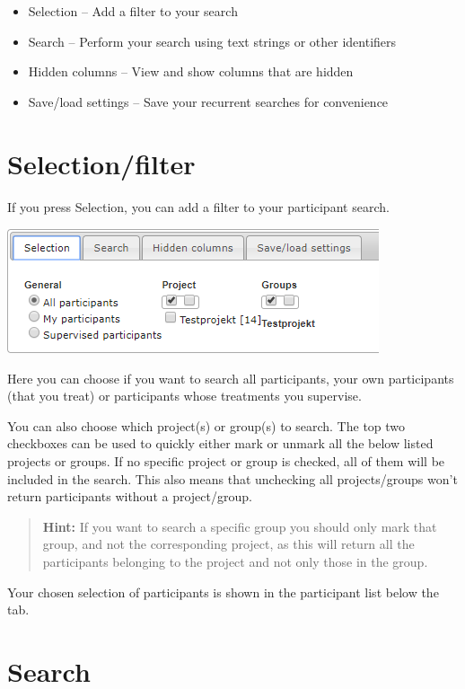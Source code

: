 \documentclass[]{book}
\providecommand{\tightlist}{%
  \setlength{\itemsep}{0pt}\setlength{\parskip}{0pt}}
\begin{document}
\begin{itemize}
\tightlist
\item
  Selection -- Add a filter to your search
\item
  Search -- Perform your search using text strings or other identifiers
\item
  Hidden columns -- View and show columns that are hidden
\item
  Save/load settings -- Save your recurrent searches for convenience
\end{itemize}

\hypertarget{selectionfilter}{%
\section{Selection/filter}\label{selectionfilter}}

If you press Selection, you can add a filter to your participant search.

\includegraphics{images/selection-filter.png}

Here you can choose if you want to search all participants, your own participants (that you treat) or participants whose treatments you supervise.

You can also choose which project(s) or group(s) to search. The top two checkboxes can be used to quickly either mark or unmark all the below listed projects or groups. If no specific project or group is checked, all of them will be included in the search. This also means that unchecking all projects/groups won't return participants without a project/group.

\begin{quote}
\textbf{Hint:} If you want to search a specific group you should only mark that group, and not the corresponding project, as this will return all the participants belonging to the project and not only those in the group.
\end{quote}

Your chosen selection of participants is shown in the participant list below the tab.

\hypertarget{search}{%
\section{Search}\label{search}}
\end{document}
